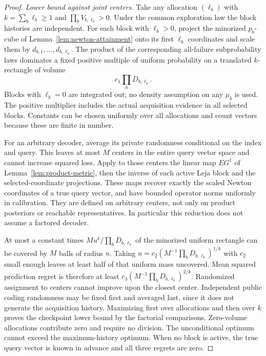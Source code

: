 \begin{proof}
\emph{Lower bound against joint centers.}
Take any allocation $(\ell_b)$ with $k=\sum_b\ell_b\ge1$ and
$\prod_bV_{b,\ell_b}>0$. Under the common exploration law the block
histories are independent. For each block with $\ell_b>0$, project the
minorized $p_b$-cube of Lemma~\ref{lem:newton-attainment} onto its first
$\ell_b$ coordinates and scale them by
$d_{b,1},\ldots,d_{b,\ell_b}$. The product of the corresponding
all-failure subprobability laws dominates a fixed positive multiple of
uniform probability on a translated $k$-rectangle of volume
\[
 c_1\prod_bD_{b,\ell_b}.
\]
Blocks with $\ell_b=0$ are integrated out; no density assumption on any
$\mu_b$ is used. The positive multiplier includes the actual acquisition
evidence in all selected blocks. Constants can be chosen uniformly over
all allocations and count vectors because these are finite in number.

For an arbitrary decoder, average its private randomness conditional on
the index and query. This leaves at most $M$ centers in the entire query
vector space and cannot increase squared loss. Apply to those centers
the linear map $E G^\dagger$ of Lemma~\ref{lem:product-metric}, then
the inverse of each active Leja block and the selected-coordinate
projections. These maps recover exactly the scaled Newton coordinates
of a true query vector, and have bounded operator norms uniformly in
calibration. They are defined on arbitrary centers, not only on product
posteriors or reachable representatives. In particular this reduction
does not assume a factored decoder.

At most a constant times
$M u^k/\prod_bD_{b,\ell_b}$ of the minorized uniform rectangle can be
covered by $M$ balls of radius $u$. Taking
$u=c_2(M^{-1}\prod_bD_{b,\ell_b})^{1/k}$ with $c_2$ small enough
leaves at least half of that uniform mass uncovered. Mean squared
prediction regret is therefore at least
$c_3(M^{-1}\prod_bD_{b,\ell_b})^{2/k}$.
Randomized assignment to centers cannot improve upon the closest center.
Independent public coding randomness may be fixed first and averaged
last, since it does not generate the acquisition history. Maximizing
first over allocations and then over $k$ proves the checkpoint lower
bound by the factorial comparisons. Zero-volume allocations contribute
zero and require no division. The unconditional optimum cannot exceed
the maximum-history optimum. When no block is active, the true query
vector is known in advance and all three regrets are zero.


\end{proof}
